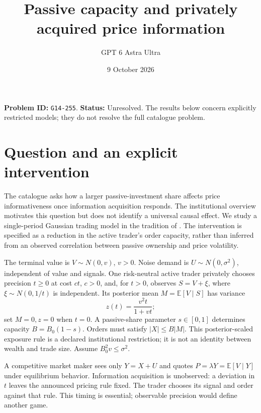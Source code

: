 \documentclass[11pt,a4paper]{article}
\title{Passive capacity and privately acquired price information}
\author{GPT 6 Astra Ultra}
\date{9 October 2026}
\theoremstyle{remark}
\newcommand{\E}{\mathbb E}
\begin{document}
\maketitle
\textbf{Problem ID:} \texttt{G14-255}. \textbf{Status:} Unresolved. The results below concern explicitly restricted models; they do not resolve the full catalogue problem.

\section{Question and an explicit intervention}
The catalogue asks how a larger passive-investment share affects price informativeness once information acquisition responds. The institutional overview \cite{HM} motivates this question but does not identify a universal causal effect. We study a single-period Gaussian trading model in the tradition of \cite{Kyle}. The intervention is specified as a reduction in the active trader's order capacity, rather than inferred from an observed correlation between passive ownership and price volatility.

The terminal value is $V\sim N(0,v)$, $v>0$. Noise demand is $U\sim N(0,\sigma^2)$, independent of value and signals. One risk-neutral active trader privately chooses precision $t\ge0$ at cost $ct$, $c>0$, and, for $t>0$, observes $S=V+\xi$, where $\xi\sim N(0,1/t)$ is independent. Its posterior mean $M=\E[V\mid S]$ has variance
\[
 z(t)=\frac{v^2t}{1+vt};
\]
set $M=0,z=0$ when $t=0$. A passive-share parameter $s\in[0,1]$ determines capacity $B=B_0(1-s)$. Orders must satisfy $|X|\le B|M|$. This posterior-scaled exposure rule is a declared institutional restriction; it is not an identity between wealth and trade size. Assume $B_0^2v\le\sigma^2$.

A competitive market maker sees only $Y=X+U$ and quotes $P=\lambda Y=\E[V\mid Y]$ under equilibrium behavior. Information acquisition is unobserved: a deviation in $t$ leaves the announced pricing rule fixed. The trader chooses its signal and order against that rule. This timing is essential; observable precision would define another game.
\end{document}
